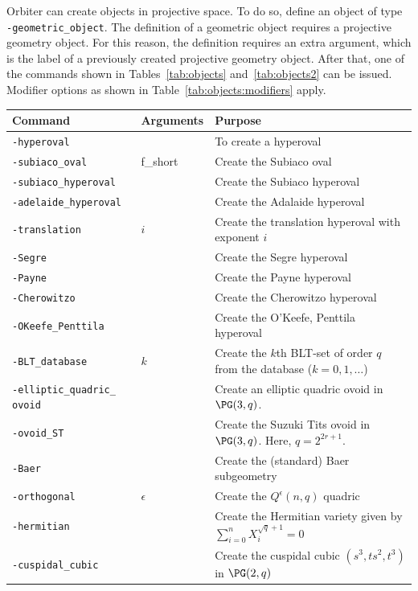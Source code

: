 Orbiter can create objects in projective space.
To do so, define an object of type
\verb'-geometric_object'.
The definition of a geometric object requires a projective geometry object. 
For this reason, the definition requires an extra argument, 
which is the label of a previously created projective geometry object.
After that, one of the commands shown in Tables~\ref{tab:objects} and~\ref{tab:objects2} can be issued.
Modifier options as shown in Table~\ref{tab:objects:modifiers} apply.
\begin{table}
\begin{center}
\begin{tabular}{|p{4cm}|l|p{8cm}|}
\hline
Command  & Arguments & Purpose \\
\hline
\hline
\verb'-hyperoval' &  & To create a hyperoval  \\
\hline
\verb'-subiaco_oval' & f\_short & Create the Subiaco oval  \\
\hline
\verb'-subiaco_hyperoval' &  & Create the Subiaco hyperoval  \\
\hline
\verb'-adelaide_hyperoval' &  & Create the Adalaide hyperoval  \\
\hline
\verb'-translation' & $i$ & Create the translation hyperoval with exponent $i$ \\
\hline
\verb'-Segre' &  & Create the Segre hyperoval  \\
\hline
\verb'-Payne' &  & Create the Payne hyperoval  \\
\hline
\verb'-Cherowitzo' &  & Create the Cherowitzo hyperoval  \\
\hline
\verb'-OKeefe_Penttila' &  & Create the O'Keefe, Penttila hyperoval  \\
\hline
\verb'-BLT_database' & $k$ & Create the $k$th BLT-set of order $q$ from the database ($k=0,1,\ldots$) \\
\hline
		\verb'-elliptic_quadric_' \verb'ovoid' &  &  Create an elliptic quadric ovoid in $\PG(3,q)$. \\
		\hline
		\verb'-ovoid_ST' &  &  Create the Suzuki Tits ovoid in $\PG(3,q)$. Here, $q=2^{2r+1}.$ \\
		\hline
\verb'-Baer' &  & Create the (standard) Baer subgeometry \\
\hline
\verb'-orthogonal' & $\epsilon$ & Create the $Q^\epsilon(n,q)$ quadric \\
\hline
\verb'-hermitian' & & Create the Hermitian variety given by $\sum_{i=0}^n X_i^{\sqrt{q}+1} = 0$\\
\hline
\verb'-cuspidal_cubic' & & Create the cuspidal cubic $(s^3,ts^2,t^3)$ in $\PG(2,q)$\\

\end{tabular}
\end{center}
\end{table}
